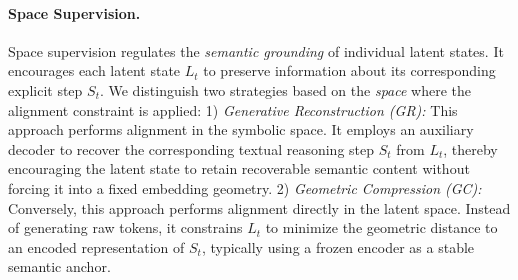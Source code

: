 \paragraph{Space Supervision.}
Space supervision regulates the \emph{semantic grounding} of individual latent states.
It encourages each latent state $L_t$ to preserve information about its corresponding explicit step $S_t$.
We distinguish two strategies based on the \textit{space} where the alignment constraint is applied:
1) \textit{Generative Reconstruction (GR):}
This approach performs alignment in the symbolic space.
It employs an auxiliary decoder to recover the corresponding textual reasoning step $S_t$ from $L_t$, thereby encouraging the latent state to retain recoverable semantic content without forcing it into a fixed embedding geometry.
2) \textit{Geometric Compression (GC):}
Conversely, this approach performs alignment directly in the latent space.
Instead of generating raw tokens, it constrains $L_t$ to minimize the geometric distance to an encoded representation of $S_t$, typically using a frozen encoder as a stable semantic anchor.


